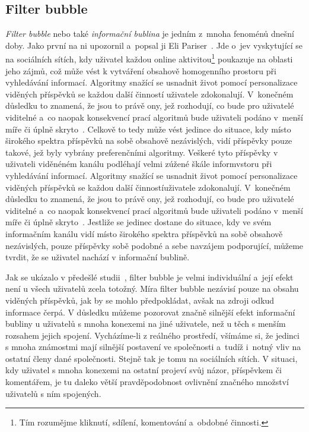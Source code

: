 \documentclass[12pt, a4paper]{article}
\numberwithin{equation}{section} 	%
\begin{document}
\subsection{Filter bubble}
\noindent \textit{Filter bubble} nebo také \textit{informační bublina} je jedním z mnoha fenoménů dnešní doby. Jako první na ni upozornil a~popsal ji Eli Pariser~\cite{Pariser2011, PariserTed}. Jde o~jev vyskytující se na sociálních sítích, kdy uživatel každou online aktivitou\footnote{Tím rozumějme kliknutí, sdílení, komentování a~obdobné činnosti.} poukazuje na oblasti jeho zájmů, což může vést k vytváření obsahově homogenního prostoru při vyhledávání informací. Algoritmy snažící se usnadnit život pomocí personalizace viděných příspěvků se každou další činností uživatele zdokonalují. V konečném důsledku to znamená, že jsou to právě ony, jež rozhodují, co bude pro uživatelé viditelné a~co naopak konsekvencí prací algoritmů bude uživateli podáno v menší míře či úplně skryto~\cite{TheImpactOfFilterBubble}. Celkově to tedy může vést jedince do situace, kdy místo širokého spektra příspěvků na sobě obsahově nezávislých, vidí příspěvky pouze takové, jež byly vybrány preferenčními algoritmy. Veškeré tyto příspěvky v uživateli viděnéném kanálu podléhají velmi zúžené škále informvstoru při vyhledávání informací. Algoritmy snažící se usnadnit život pomocí personalizace viděných příspěvků se každou další činnostíuživatele zdokonalují. V konečném důsledku to znamená, že jsou to právě ony, jež rozhodují, co bude pro uživatelé viditelné a~co naopak konsekvencí prací algoritmů bude uživateli podáno v menší míře či úplně skryto~\cite{TheImpactOfFilterBubble}. Jestliže se jedinec dostane do situace, kdy ve svém informačním kanálu vidí místo širokého spektra příspěvků na sobě obsahově nezávislých, pouze příspěvky sobě podobné a sebe navzájem podporující, můžeme tvrdit, že se uživatel nachází v informační bublině.

Jak se ukázalo v předešlé studii~\cite{TheImpactOfFilterBubble}, filter bubble je velmi individuální a~její efekt není u všech uživatelů zcela totožný. Míra filter bubble nezávisí pouze na obsahu viděných příspěvků, jak by se mohlo předpokládat, avšak na zdroji odkud informace čerpá. V důsledku můžeme pozorovat značně silnější efekt informační bubliny u uživatelů s mnoha konexemi na jiné uživatele, než u těch s menším rozsahem jejich spojení. Vycházíme-li z reálného prostředí, všímáme si, že jedinci s mnoha známostmi mají silnější postavení ve společnosti a~tudíž i~notný vliv na ostatní členy dané společnosti. Stejně tak je tomu na sociálních sítích. V situaci, kdy uživatel s mnoha konexemi na ostatní projeví svůj názor, příspěvkem či komentářem, je tu daleko větší pravděpodobnost ovlivnění značného množství uživatelů s ním spojených.
\end{document}

